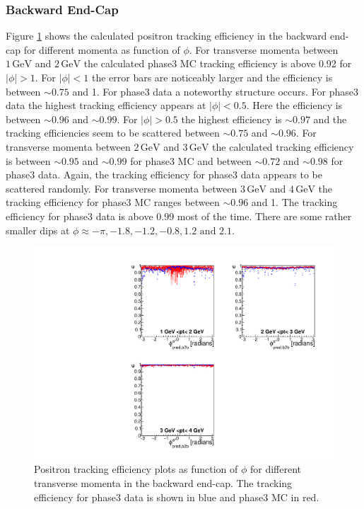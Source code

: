 \documentclass[a4paper,11pt,twosided,final,german,openbib,pdftex,listof=totoc,bibliography=totoc]{scrbook}
\begin{document}
\clearpage

\subsubsection{Backward End-Cap}


Figure \ref{plt:xPtMPhiepEC3} shows the calculated positron tracking efficiency in the backward end-cap for different momenta as function of $\phi$.
For transverse momenta between $1\,\textrm{GeV}$ and $2\,\textrm{GeV}$ the calculated phase3 MC tracking efficiency is above 0.92 for $|\phi| >1$. For $|\phi|<1$ the error bars are noticeably larger and the efficiency is between $\sim 0.75$ and 1. For phase3 data a noteworthy structure occurs. For phase3 data the highest tracking efficiency appears at $|\phi| <0.5$. Here the efficiency is between $\sim 0.96$ and $\sim 0.99$. For $|\phi| > 0.5$ the highest efficiency is $\sim 0.97$ and the tracking efficiencies seem to be scattered between $\sim 0.75$ and $\sim 0.96$.
For transverse momenta between $2\,\textrm{GeV}$ and $3\,\textrm{GeV}$ the calculated tracking efficiency is between $\sim 0.95$ and $\sim 0.99$ for phase3 MC and between $\sim 0.72$ and $\sim 0.98$ for phase3 data. Again, the tracking efficiency for phase3 data appears to be scattered randomly.
For transverse momenta between $3\,\textrm{GeV}$ and $4\,\textrm{GeV}$ the tracking efficiency for phase3 MC ranges between $\sim 0.96$ and 1. The tracking efficiency for phase3 data is above 0.99 most of the time. There are some rather smaller dips at $\phi \approx -\pi, -1.8, -1.2, -0.8, 1.2 \textrm{ and } 2.1$.



\begin{figure}[!htbp]
	\centering
	\includegraphics[width=\textwidth]{Plots/master3/xPtMPhiepECP3}
	\caption[Transverse Momentum $\phi$ Positron Backward End-Cap Efficiency Phase3]{Positron tracking efficiency plots as function of $\phi$ for different transverse momenta in the backward end-cap. The tracking efficiency for phase3 data is shown in blue and phase3 MC in red.}
	
	\label{plt:xPtMPhiepEC3}
\end{figure}
\end{document}
